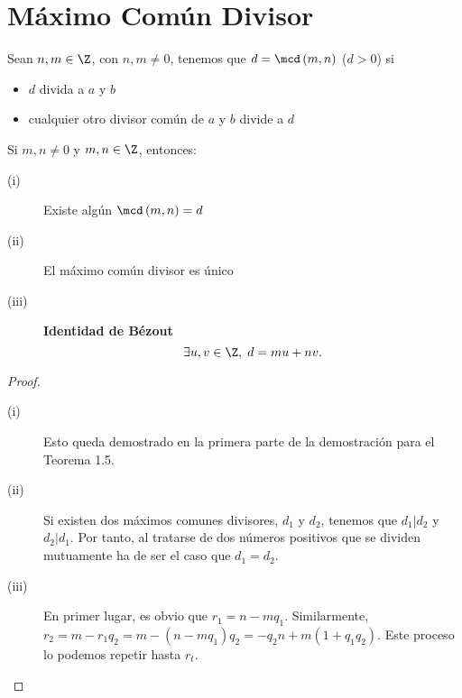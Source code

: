 \section{Máximo Común Divisor}

\begin{fdefinition}
\normalfont Sean $\displaystyle n,m \in \Z $, con $\displaystyle n, m \neq 0 $, tenemos que $\displaystyle d = \mcd\left(m,n\right) $ ($\displaystyle d>0 $) si 
\begin{itemize}
\item $\displaystyle d $ divida a $\displaystyle a $ y $\displaystyle b $ 
\item cualquier otro divisor común de $\displaystyle a $ y $\displaystyle b $ divide a $\displaystyle d $  
\end{itemize}
\end{fdefinition}
 \begin{ftheorem}[]
 \normalfont Si $\displaystyle m,n \neq0 $ y $\displaystyle m,n \in \Z $, entonces:
 \begin{description}
 \item[(i)] Existe algún $\displaystyle \mcd\left(m,n\right)=d $ 
\item[(ii)] El máximo común divisor es único
\item[(iii)] \textbf{Identidad de Bézout} 
	\[\exists u,v \in \Z, \; d = mu + nv .\]
 \end{description}
 \end{ftheorem}

 \begin{proof}
 \begin{description}
 \item[(i)] Esto queda demostrado en la primera parte de la demostración para el Teorema 1.5. 
\item[(ii)] Si existen dos máximos comunes divisores, $\displaystyle d_{1} $ y $\displaystyle d_{2} $, tenemos que $\displaystyle d_{1}|d_{2} $ y $\displaystyle d_{2}|d_{1} $. Por tanto, al tratarse de dos números positivos que se dividen mutuamente ha de ser el caso que $\displaystyle d_{1}=d_{2} $.
\item[(iii)] En primer lugar, es obvio que $\displaystyle r_{1}=n - mq_{1}$. Similarmente, $\displaystyle r_{2} = m - r_{1}q_{2}= m - \left(n-mq_{1}\right)q_{2}=-q_{2}n+m\left(1+q_{1}q_{2}\right) $. Este proceso lo podemos repetir hasta $\displaystyle r_{t} $.
 \end{description}
 
 \end{proof}

